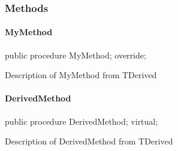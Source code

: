\documentclass{report}
\newif\ifpdf
\begin{document}
\subsubsection*{\large{\textbf{Methods}}\normalsize\hspace{1ex}\hfill}
\paragraph*{MyMethod}\hspace*{\fill}

\label{ok_inherited_members_hide_ancestor.TDerived-MyMethod}
\begin{list}{}{
\setlength{\itemindent}{0cm}
\setlength{\listparindent}{0cm}
\setlength{\leftmargin}{\evensidemargin}
\addtolength{\leftmargin}{\tmplength}
\settowidth{\labelsep}{X}
\addtolength{\leftmargin}{\labelsep}
\setlength{\labelwidth}{\tmplength}
}
\item[\textbf{Declaration}\hfill]
\ifpdf
\begin{flushleft}
\fi
\begin{ttfamily}
public procedure MyMethod; override;\end{ttfamily}

\ifpdf
\end{flushleft}
\fi

\par
\item[\textbf{Description}]
Description of MyMethod from TDerived

\end{list}
\paragraph*{DerivedMethod}\hspace*{\fill}

\label{ok_inherited_members_hide_ancestor.TDerived-DerivedMethod}
\begin{list}{}{
\setlength{\itemindent}{0cm}
\setlength{\listparindent}{0cm}
\setlength{\leftmargin}{\evensidemargin}
\addtolength{\leftmargin}{\tmplength}
\settowidth{\labelsep}{X}
\addtolength{\leftmargin}{\labelsep}
\setlength{\labelwidth}{\tmplength}
}
\item[\textbf{Declaration}\hfill]
\ifpdf
\begin{flushleft}
\fi
\begin{ttfamily}
public procedure DerivedMethod; virtual;\end{ttfamily}

\ifpdf
\end{flushleft}
\fi

\par
\item[\textbf{Description}]
Description of DerivedMethod from TDerived

\end{list}
\end{document}
